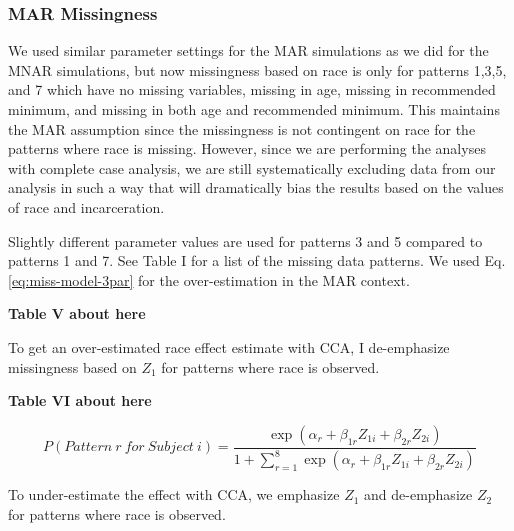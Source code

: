\documentclass[titlepage]{article}
\begin{document}
\subsubsection{MAR Missingness}

We used similar parameter settings for the MAR simulations as we did for the MNAR simulations, but now missingness based on race is only for patterns 1,3,5, and 7 which have no missing variables, missing in age, missing in recommended minimum, and missing in both age and recommended minimum. This maintains the MAR assumption since the missingness is not contingent on race for the patterns where race is missing. However, since we are performing the analyses with complete case analysis, we are still systematically excluding data from our analysis in such a way that will dramatically bias the results based on the values of race and incarceration.

Slightly different parameter values are used for patterns 3 and 5 compared to patterns 1 and 7. See Table I for a list of the missing data patterns. We used Eq. \ref{eq:miss-model-3par} for the over-estimation in the MAR context. 

\begin{center}
    \textbf{Table V about here}
\end{center}

To get an over-estimated race effect estimate with CCA, I de-emphasize missingness based on \(Z_1\) for patterns where race is observed.

\begin{center}
    \textbf{Table VI about here}
\end{center}

\begin{equation}\label{eq:miss-model-2par}
    P(Pattern ~ r ~ for ~ Subject ~ i) = \frac{\exp\left(\alpha_r + \beta_{1r} Z_{1i} + \beta_{2r} Z_{2i}\right)}{1 + \sum_{r=1}^8 \exp\left(\alpha_r + \beta_{1r} Z_{1i} + \beta_{2r} Z_{2i}\right)}
\end{equation}

To under-estimate the effect with CCA, we emphasize \(Z_1\) and de-emphasize \(Z_2\) for patterns where race is observed.
\end{document}
